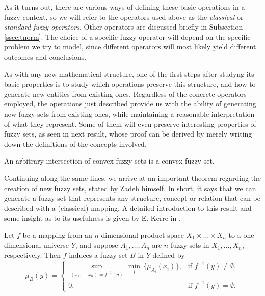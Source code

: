 As it turns out, there are various ways of defining these basic operations in a fuzzy context, so we will refer to the operators used above as the \textit{classical} or \textit{standard fuzzy operators}. Other operators are discussed briefly in Subsection \ref{ssec:tnorm}. The choice of a specific fuzzy operator will depend on the specific problem we try to model, since different operators will most likely yield different outcomes and conclusions.

As with any new mathematical structure, one of the first steps after studyng its basic properties is to study which operations preserve this structure, and how to generate new entities from existing ones. Regardless of the concrete operators employed, the operations just described provide us with the ability of generating new fuzzy sets from existing ones, while maintaining a reasonable interpretation of what they represent. Some of them will even preserve interesting properties of fuzzy sets, as seen in next result, whose proof can be derived by merely writing down the definitions of the concepts involved.

\begin{prop} An arbitrary intersection of convex fuzzy sets is a convex fuzzy set.
\end{prop}

Continuing along the same lines, we arrive at an important theorem regarding the creation of new fuzzy sets, stated by Zadeh himself. In short, it says that we can generate a fuzzy set that represents any structure, concept or relation that can be described with a (classical) mapping. A detailed introduction to this result and some insight as to its usefulness is given by E. Kerre in \cite{kerre2011tribute}.

\begin{theorem} Let $f$ be a mapping from an $n$-dimensional product space $X_1 \times \dots \times X_n$ to a one-dimensional universe $Y$, and suppose $A_1, \dots, A_n$ are $n$ fuzzy sets in $X_1, \dots, X_n$, respectively. Then $f$ induces a fuzzy set $B$ in $Y$ defined by
\[
\mu_B(y) = \left\{ \begin{array}{cc}
	\sup\limits_{(x_1, \dots, x_n) = f^{-1}(y)} \, \min\limits_i \, \{ \mu_{A_i}(x_i) \}, & \text{if } f^{-1}(y) \ne \emptyset, \\
	0, & \text{if } f^{-1}(y) = \emptyset.
\end{array}\right.
\]

\end{theorem}

